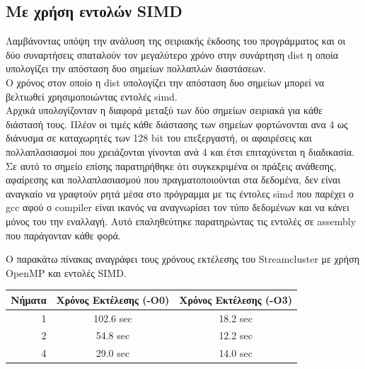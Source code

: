 \documentclass[a4paper,11pt]{article}
\begin{document}
\subsection{Με χρήση εντολών SIMD}
Λαμβάνοντας υπόψη την ανάλυση της σειριακής έκδοσης του προγράμματος και οι δύο συναρτήσεις σπαταλούν τον μεγαλύτερο χρόνο στην συνάρτηση dist η οποία υπολογίζει την απόσταση δυο σημείων πολλαπλών διαστάσεων.\\
Ο χρόνος στον οποίο η dist υπολογίζει την απόσταση δυο σημείων μπορεί να βελτιωθεί χρησιμοποιώντας εντολές simd.\\
Αρχικά υπολογίζονταν η διαφορά μεταξύ των δύο σημείων σειριακά για κάθε διάστασή τους. Πλέον οι τιμές κάθε διάστασης των σημείων φορτώνονται ανα 4 ως διάνυσμα σε καταχωρητές των 128 bit του επεξεργαστή, οι αφαιρέσεις και πολλαπλασιασμοί που χρειάζονται γίνονται ανά 4 και έτσι επιταχύνεται η διαδικασία.
Σε αυτό το σημείο επίσης παρατηρήθηκε ότι συγκεκριμένα οι πράξεις ανάθεσης, αφαίρεσης και πολλαπλασιασμού που πραγματοποιούνται στα δεδομένα, δεν είναι αναγκαίο να γραφτούν ρητά μέσα στο πρόγραμμα με τις έντολες simd που παρέχει ο gcc αφού ο compiler είναι ικανός να αναγνωρίσει τον τύπο δεδομένων και να κάνει μόνος του την εναλλαγή. Αυτό επαληθεύτηκε παρατηρώντας τις εντολές σε assembly που παράγονταν κάθε φορά.

Ο παρακάτω πίνακας αναγράφει τους χρόνους εκτέλεσης του Streamcluster με χρήση OpenMP και εντολές SIMD.

\begin{center}
\begin{tabular}{|r|c|c|}
    \hline
    Νήματα & Χρόνος Εκτέλεσης (-O0) & Χρόνος Εκτέλεσης (-Ο3) \\ \hline
    1 & 102.6 sec & 18.2 sec \\
    2 & 54.8 sec & 12.2 sec \\
    4 & 29.0 sec & 14.0 sec \\ \hline
\end{tabular}
\end{center}
\pagebreak
\end{document}
